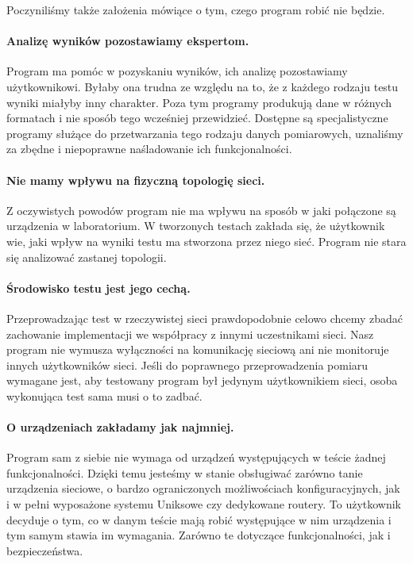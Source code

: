 \documentclass[00-praca-magisterska.tex]{subfiles}
\begin{document}
Poczyniliśmy także założenia mówiące o tym, czego program robić nie będzie.

\paragraph{Analizę wyników pozostawiamy ekspertom.} Program ma pomóc w
pozyskaniu wyników, ich analizę pozostawiamy użytkownikowi. Byłaby ona trudna ze
względu na to, że z każdego rodzaju testu wyniki miałyby inny charakter. Poza
tym programy produkują dane w różnych formatach i nie sposób tego wcześniej
przewidzieć. Dostępne są specjalistyczne programy służące do przetwarzania tego
rodzaju danych pomiarowych, uznaliśmy za zbędne i niepoprawne naśladowanie ich
funkcjonalności.

\paragraph{Nie mamy wpływu na fizyczną topologię sieci.} Z oczywistych powodów
program nie ma wpływu na sposób w jaki połączone są urządzenia w laboratorium. W
tworzonych testach zakłada się, że użytkownik wie, jaki wpływ na wyniki testu ma
stworzona przez niego sieć. Program nie stara się analizować zastanej topologii.

\paragraph{Środowisko testu jest jego cechą.} Przeprowadzając test w
rzeczywistej sieci prawdopodobnie celowo chcemy zbadać zachowanie implementacji
we współpracy z innymi uczestnikami sieci. Nasz program nie wymusza wyłączności
na komunikację sieciową ani nie monitoruje innych użytkowników sieci. Jeśli do
poprawnego przeprowadzenia pomiaru wymagane jest, aby testowany program był
jedynym użytkownikiem sieci, osoba wykonująca test sama musi o to zadbać.

\paragraph{O urządzeniach zakładamy jak najmniej.} Program sam z siebie nie
wymaga od urządzeń występujących w teście żadnej funkcjonalności. Dzięki temu
jesteśmy w stanie obsługiwać zarówno tanie urządzenia sieciowe, o bardzo
ograniczonych możliwościach konfiguracyjnych, jak i w pełni wyposażone systemu
Uniksowe czy dedykowane routery. To użytkownik decyduje o tym, co w danym teście
mają robić występujące w nim urządzenia i tym samym stawia im wymagania. Zarówno
te dotyczące funkcjonalności, jak i bezpieczeństwa.
\end{document}
